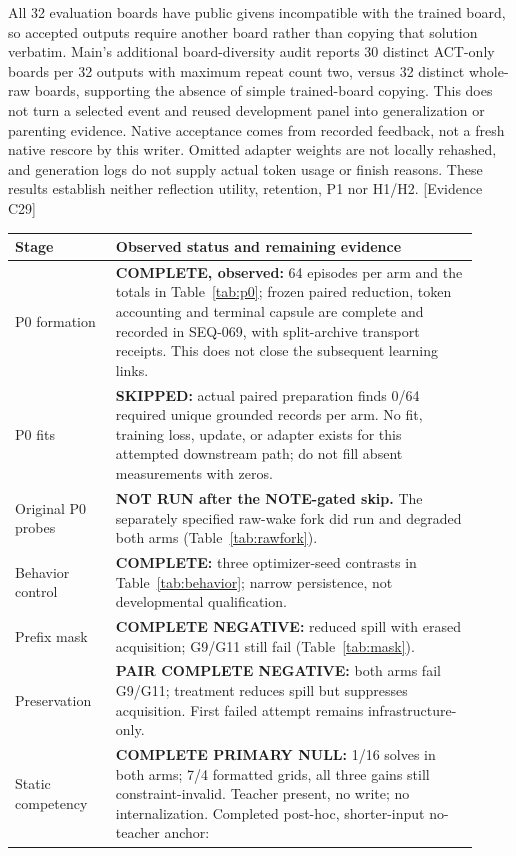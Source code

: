 \documentclass[11pt]{article}
\newcommand{\ev}[1]{\textsf{[Evidence #1]}}
\begin{document}
All 32 evaluation boards have public givens incompatible with the trained
board, so accepted outputs require another board rather than copying that
solution verbatim. Main's additional board-diversity audit reports 30 distinct
ACT-only boards per 32 outputs with maximum repeat count two, versus 32 distinct
whole-raw boards, supporting the absence of simple trained-board copying.
This does not turn a selected event and reused development
panel into generalization or parenting evidence. Native acceptance comes from
recorded feedback, not a fresh native rescore by this writer. Omitted adapter
weights are not locally rehashed, and generation logs do not supply actual
token usage or finish reasons. These results establish neither
reflection utility, retention, P1 nor H1/H2. \ev{C29}

\begin{longtable}{p{0.20\linewidth}p{0.72\linewidth}}
\toprule
Stage & Observed status and remaining evidence \\
\midrule
P0 formation & \textbf{COMPLETE, observed:} 64 episodes per arm and the totals in
Table~\ref{tab:p0}; frozen paired reduction, token accounting and terminal capsule
are complete and recorded in SEQ-069, with split-archive transport receipts.
This does not close the subsequent learning links. \\
P0 fits & \textbf{SKIPPED:} actual paired preparation finds 0/64 required unique
grounded records per arm. No fit, training loss, update, or adapter exists for
this attempted downstream path; do not fill absent measurements with zeros. \\
Original P0 probes & \textbf{NOT RUN after the NOTE-gated skip.} The separately
specified raw-wake fork did run and degraded both arms (Table~\ref{tab:rawfork}). \\
Behavior control & \textbf{COMPLETE:} three optimizer-seed contrasts in
Table~\ref{tab:behavior}; narrow persistence, not developmental qualification. \\
Prefix mask & \textbf{COMPLETE NEGATIVE:} reduced spill with erased acquisition;
G9/G11 still fail (Table~\ref{tab:mask}). \\
Preservation & \textbf{PAIR COMPLETE NEGATIVE:} both arms fail G9/G11; treatment
reduces spill but suppresses acquisition. First failed attempt remains
infrastructure-only. \\
Static competency & \textbf{COMPLETE PRIMARY NULL:} 1/16 solves in both arms;
7/4 formatted grids, all three gains still constraint-invalid. Teacher present,
no write; no internalization. Completed post-hoc, shorter-input no-teacher anchor:

\end{longtable}
\end{document}
